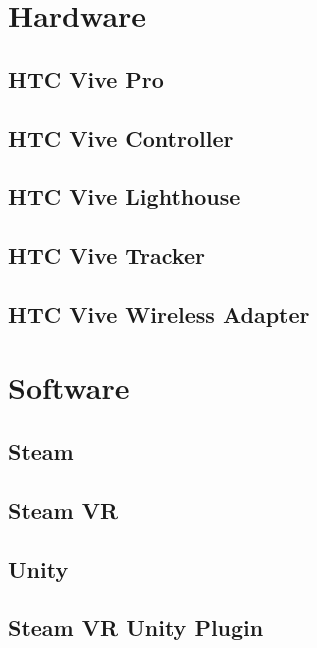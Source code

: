 \section{Hardware}
\lipsum[5-12]

\subsection{HTC Vive Pro}
\lipsum[5-12]

\subsection{HTC Vive Controller}
\lipsum[5-12]

\subsection{HTC Vive Lighthouse}
\lipsum[5-12]

\subsection{HTC Vive Tracker}
\lipsum[5-12]

\subsection{HTC Vive Wireless Adapter }
\lipsum[5-12]

\section{Software}

\subsection{Steam}
\lipsum[5-12]

\subsection{Steam VR}
\lipsum[5-12]

\subsection{Unity}
\lipsum[5-12]

\subsection{Steam VR Unity Plugin}
\lipsum[5-12]

